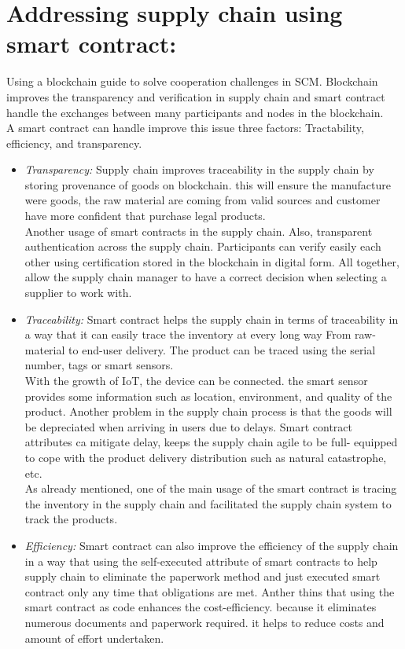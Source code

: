 \section{Addressing supply chain using smart contract: }
Using a blockchain guide to solve cooperation challenges in SCM. Blockchain improves the transparency and verification in supply chain and smart contract handle the exchanges between many participants and nodes in the blockchain.\\
A smart contract can handle improve this issue three factors: Tractability, efficiency, and transparency. \\
\begin{itemize}
	\item \textit{Transparency:} Supply chain improves traceability in the supply chain by storing provenance of goods on blockchain. this will ensure the manufacture were goods, the raw material are coming from valid sources and customer have more confident that purchase legal products.\\ 
	Another usage of smart contracts in the supply chain. Also, transparent authentication across the supply chain. Participants can verify easily each other using certification stored in the blockchain in digital form. All together, allow the supply chain manager to have a correct decision when selecting a supplier to work with.\\
	\item \textit{Traceability:} Smart contract helps the supply chain in terms of traceability in a way that it can easily trace the inventory at every long way From raw-material to end-user delivery. The product can be traced using the serial number, tags or smart sensors.\\
	With the growth of IoT, the device can be connected. the smart sensor provides some information such as location, environment, and quality of the product. Another problem in the supply chain process is that the goods will be depreciated when arriving in users due to delays. Smart contract attributes ca mitigate delay, keeps the supply chain agile to be full- equipped to cope with the product delivery distribution such as natural catastrophe, etc. \\
	As already mentioned, one of the main usage of the smart contract is tracing the inventory in the supply chain and facilitated the supply chain system to track the products.\\
	\item \textit{Efficiency:}  Smart contract can also improve the efficiency of the supply chain in a way that using the self-executed attribute of smart contracts to help supply chain to eliminate the paperwork method and just executed smart contract only any time that obligations are met. Anther thins that using the smart contract as code enhances the cost-efficiency. because it eliminates numerous documents and paperwork required. it helps to reduce costs and amount of effort undertaken\cite{Angwei}.\\ 
\end{itemize}

